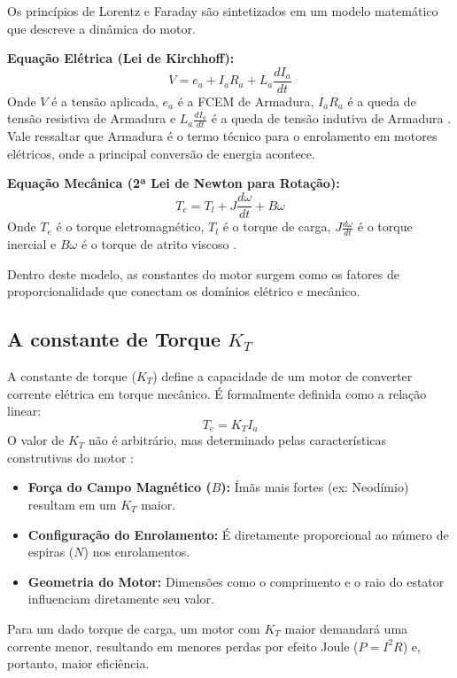 \documentclass[12pt, a4paper, openright, oneside, brazilian]{abntex2}
\begin{document}
Os princípios de Lorentz e Faraday são sintetizados em um modelo matemático que descreve a dinâmica do motor.

\textbf{Equação Elétrica (Lei de Kirchhoff):}
\begin{equation}
    V = e_a + I_a R_a + L_a \frac{dI_a}{dt}
\end{equation}
Onde $V$ é a tensão aplicada, $e_a$ é a FCEM de Armadura, $I_a R_a$ é a queda de tensão resistiva de Armadura e $L_a \frac{dI_a}{dt}$ é a queda de tensão indutiva de Armadura \parencite{maquinasEletricasFitzgerald}. Vale ressaltar que Armadura é o termo técnico para o enrolamento em motores elétricos, onde a principal conversão de energia acontece.

\textbf{Equação Mecânica (2ª Lei de Newton para Rotação):}
\begin{equation}
    T_e = T_l + J \frac{d\omega}{dt} + B\omega
\end{equation}
Onde $T_e$ é o torque eletromagnético, $T_l$ é o torque de carga, $J\frac{d\omega}{dt}$ é o torque inercial e $B\omega$ é o torque de atrito viscoso \parencite{maquinasEletricasFitzgerald}.

Dentro deste modelo, as constantes do motor surgem como os fatores de proporcionalidade que conectam os domínios elétrico e mecânico.

\subsection{\texorpdfstring{A constante de Torque $K_T$}{A constante de Torque KT}}
\label{KT}
A constante de torque ($K_T$) define a capacidade de um motor de converter corrente elétrica em torque mecânico. É formalmente definida como a relação linear:
\begin{equation}
    T_e = K_T I_a
\end{equation}
O valor de $K_T$ não é arbitrário, mas determinado pelas características construtivas do motor \parencite{hendershot1994design}:
\begin{itemize}
    \item \textbf{Força do Campo Magnético ($B$):} Ímãs mais fortes (ex: Neodímio) resultam em um $K_T$ maior.
    \item \textbf{Configuração do Enrolamento:} É diretamente proporcional ao número de espiras ($N$) nos enrolamentos.
    \item \textbf{Geometria do Motor:} Dimensões como o comprimento e o raio do estator influenciam diretamente seu valor.
\end{itemize}
Para um dado torque de carga, um motor com $K_T$ maior demandará uma corrente menor, resultando em menores perdas por efeito Joule ($P = I^2 R$) e, portanto, maior eficiência.
\end{document}
